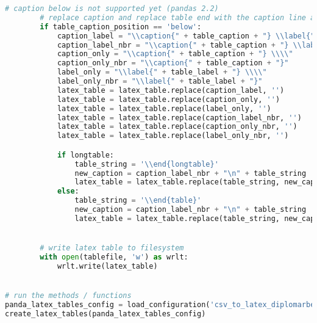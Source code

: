 \begin{lstlisting}[language=python, caption=Python LaTex - pandas\_dataframe\_to\_latex\_table.py CSV - LaTex Tabelle,captionpos=b,label={lst:Python LaTex - pandas_dataframe_to_latex_table},breaklines=true]
        # caption below is not supported yet (pandas 2.2)
        # replace caption and replace table end with the caption line and table end
        if table_caption_position == 'below':
            caption_label = "\\caption{" + table_caption + "} \\label{" + table_label + "} \\\\"
            caption_label_nbr = "\\caption{" + table_caption + "} \\label{" + table_label + "}"
            caption_only = "\\caption{" + table_caption + "} \\\\"
            caption_only_nbr = "\\caption{" + table_caption + "}"
            label_only = "\\label{" + table_label + "} \\\\"
            label_only_nbr = "\\label{" + table_label + "}"
            latex_table = latex_table.replace(caption_label, '')
            latex_table = latex_table.replace(caption_only, '')
            latex_table = latex_table.replace(label_only, '')
            latex_table = latex_table.replace(caption_label_nbr, '')
            latex_table = latex_table.replace(caption_only_nbr, '')
            latex_table = latex_table.replace(label_only_nbr, '')

            if longtable:
                table_string = '\\end{longtable}'
                new_caption = caption_label_nbr + "\n" + table_string
                latex_table = latex_table.replace(table_string, new_caption)
            else:
                table_string = '\\end{table}'
                new_caption = caption_label_nbr + "\n" + table_string
                latex_table = latex_table.replace(table_string, new_caption)


        # write latex table to filesystem
        with open(tablefile, 'w') as wrlt:
            wrlt.write(latex_table)


# run the methods / functions
panda_latex_tables_config = load_configuration('csv_to_latex_diplomarbeit.yaml')
create_latex_tables(panda_latex_tables_config)
\end{lstlisting}